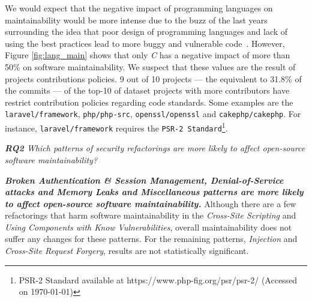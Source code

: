 \documentclass[10pt,conference]{IEEEtran}
\begin{document}
{\begin{itemize}
\end{itemize}


We would expect that the negative impact of programming languages on maintainability 
would be more intense due to the buzz of the last years surrounding the idea that 
poor design of programming languages and lack of using the best practices lead to 
more buggy and vulnerable code~\cite{Ray:2017:LSP:3144574.3126905, 2019arXiv190110220B}. 
However, Figure \ref{fig:lang_main} shows that only \emph{C} has a negative impact of more than 50\% on 
software maintainability. We suspect that these values are the result of projects 
contributions policies. 9 out of 10 projects --- the equivalent to 31.8\% of the commits --- 
of the top-10 of dataset projects with more contributors have restrict contribution 
policies regarding code standards. Some examples are the \texttt{laravel/framework}, 
\texttt{php/php-src}, \texttt{openssl/openssl} and 
\texttt{cakephp/cakephp}. For instance, \texttt{laravel/framework} requires the 
\texttt{PSR-2 Standard}\footnote{PSR-2 Standard available at 
https://www.php-fig.org/psr/psr-2/ (Accessed on \today{})}.

\begin{framed}
\textit{\textbf{RQ2} Which patterns of security refactorings are more likely to affect open-source software maintainability?}
\end{framed}

\textbf{\textit{Broken Authentication \& Session Management, Denial-of-Service attacks and Memory Leaks and Miscellaneous patterns are more likely to affect open-source software maintainability.}} Although there are
a few refactorings that harm software maintainability in the \emph{Cross-Site Scripting} and \emph{Using
Components with Know Vulnerabilities}, overall maintainability does not suffer any changes for these patterns.
For the remaining patterns, \emph{Injection} and \emph{Cross-Site Request Forgery}, results are not statistically
significant.

}
\end{document}
